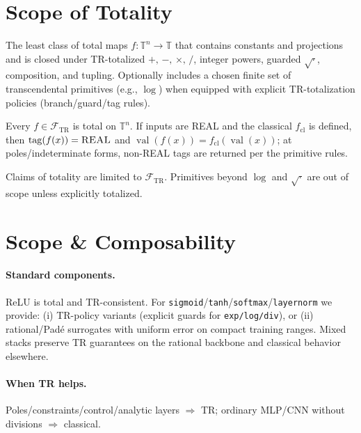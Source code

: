 \documentclass[twoside,11pt]{article}
\newcommand{\TR}{\mathbb{T}}
\newcommand{\trReal}{\textsc{REAL}}
\newcommand{\TAGREAL}{\trReal}
\begin{document}
\section*{Scope of Totality}
\label{sec:totality}
\begin{definition}\label{def:FTR}
The least class of total maps \(f:\TR^n\to\TR\) that contains constants and projections and is closed under TR-totalized \(+,\,-,\,\times,\,/\), integer powers, guarded \(\sqrt{\cdot}\), composition, and tupling. Optionally includes a chosen finite set of transcendental primitives (e.g., \(\log\)) when equipped with explicit TR-totalization policies (branch/guard/tag rules).
\end{definition}
\begin{proposition}\label{prop:totality}
Every $f\in\mathcal{F}_{\!\mathrm{TR}}$ is total on $\TR^n$. If inputs are \TAGREAL{} and the classical $f_{\mathrm{cl}}$ is defined, then $\operatorname{tag}(f(x))=\TAGREAL$ and $\operatorname{val}(f(x))=f_{\mathrm{cl}}(\operatorname{val}(x))$; at poles/indeterminate forms, non-\TAGREAL{} tags are returned per the primitive rules.
\end{proposition}
\begin{remark}[Transcendentals]
Claims of totality are limited to \(\mathcal{F}_{\!\mathrm{TR}}\). Primitives beyond \(\log\) and \(\sqrt{\cdot}\) are out of scope unless explicitly totalized.
\end{remark}

\section*{Scope \& Composability}
\label{sec:scope-composability}
\paragraph{Standard components.} ReLU is total and TR-consistent. For \texttt{sigmoid}/\texttt{tanh}/\texttt{softmax}/\texttt{layernorm} we provide: (i) TR-policy variants (explicit guards for \texttt{exp/log/div}), or (ii) rational/Pad\'e surrogates with uniform error on compact training ranges. Mixed stacks preserve TR guarantees on the rational backbone and classical behavior elsewhere.
\paragraph{When TR helps.} Poles/constraints/control/analytic layers \(\Rightarrow\) TR; ordinary MLP/CNN without divisions \(\Rightarrow\) classical.
\end{document}
